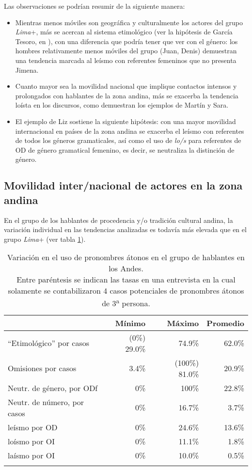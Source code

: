 \documentclass[output=paper]{../langscibook}
\begin{document}
Las observaciones se podrían resumir de la siguiente manera:

\begin{itemize}
\item Mientras menos móviles son geográfica y culturalmente los actores del grupo \textit{Lima}+, más se acercan al sistema etimológico (ver la hipótesis de García Tesoro, en \citealt{GarcíaTesoroMick2013}), con una diferencia que podría tener que ver con el género: los hombres relativamente menos móviles del grupo (Juan, Denis) demuestran una tendencia marcada al leísmo con referentes femeninos que no presenta Jimena.
\item Cuanto mayor sea la movilidad nacional que implique contactos intensos y prolongados con hablantes de la zona andina, más se exacerba la tendencia loísta en los discursos, como demuestran los ejemplos de Martín y Sara.
\item El ejemplo de Liz sostiene la siguiente hipótesis: con una mayor movilidad internacional en países de la zona andina se exacerba el leísmo con referentes de todos los géneros gramaticales, así como el uso de \textit{lo/s} para referentes de OD de género gramatical femenino, es decir, se neutraliza la distinción de género.
\end{itemize}

\subsection{Movilidad inter/nacional de actores en la zona andina}\label{sec:mick:6.2}

En el grupo de los hablantes de procedencia y/o tradición cultural andina, la variación individual en las tendencias analizadas es todavía más elevada que en el grupo \textit{Lima}+ (ver tabla \ref{tab:mick:7}).

\begin{table}
\caption{\label{tab:mick:7} Variación en el uso de pronombres átonos en el grupo de hablantes en los Andes.\\Entre paréntesis se indican las tasas en una entrevista en la cual solamente se contabilizaron 4 casos potenciales de pronombres átonos de 3\textsuperscript{a} persona.}
\begin{tabularx}{\textwidth}{Xrrr}
\lsptoprule
& \textbf{Mínimo} & \textbf{Máximo} & \textbf{Promedio}\\
\midrule
“Etimológico” por casos & (0\%) 29.0\% & 74.9\% & 62.0\%\\
Omisiones por casos & 3.4\% & (100\%) 81.0\% & 20.9\%\\
Neutr. de género, por ODf & 0\% & 100\% & 22.8\%\\
Neutr. de número, por casos & 0\% & 16.7\% & 3.7\%\\
leísmo por OD & 0\% & 24.6\% & 13.6\%\\
loísmo por OI  & 0\% & { 11.1\%}& { 1.8\%}\\
laísmo por OI & { 0\%} & 10.0\% & 0.5\%\\
\lspbottomrule
\end{tabularx}
\end{table}
\end{document}
